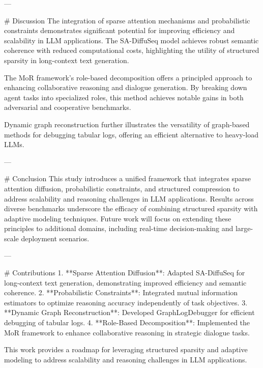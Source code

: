 ---

# Discussion  
The integration of sparse attention mechanisms and probabilistic constraints demonstrates significant potential for improving efficiency and scalability in LLM applications. The SA-DiffuSeq model achieves robust semantic coherence with reduced computational costs, highlighting the utility of structured sparsity in long-context text generation.  

The MoR framework's role-based decomposition offers a principled approach to enhancing collaborative reasoning and dialogue generation. By breaking down agent tasks into specialized roles, this method achieves notable gains in both adversarial and cooperative benchmarks.  

Dynamic graph reconstruction further illustrates the versatility of graph-based methods for debugging tabular logs, offering an efficient alternative to heavy-load LLMs.  

---

# Conclusion  
This study introduces a unified framework that integrates sparse attention diffusion, probabilistic constraints, and structured compression to address scalability and reasoning challenges in LLM applications. Results across diverse benchmarks underscore the efficacy of combining structured sparsity with adaptive modeling techniques. Future work will focus on extending these principles to additional domains, including real-time decision-making and large-scale deployment scenarios.  

---

# Contributions  
1. **Sparse Attention Diffusion**: Adapted SA-DiffuSeq for long-context text generation, demonstrating improved efficiency and semantic coherence.  
2. **Probabilistic Constraints**: Integrated mutual information estimators to optimize reasoning accuracy independently of task objectives.  
3. **Dynamic Graph Reconstruction**: Developed GraphLogDebugger for efficient debugging of tabular logs.  
4. **Role-Based Decomposition**: Implemented the MoR framework to enhance collaborative reasoning in strategic dialogue tasks.  

This work provides a roadmap for leveraging structured sparsity and adaptive modeling to address scalability and reasoning challenges in LLM applications.  